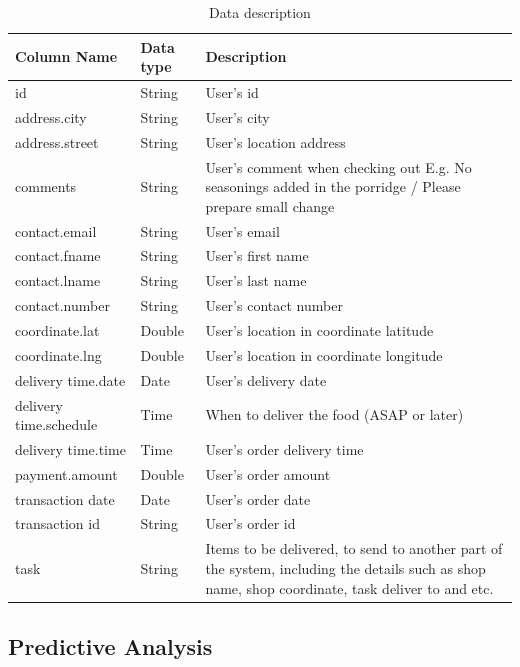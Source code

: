 \documentclass[journal]{IEEEtran}
\begin{document}
\begin{table}[!ht]
	\renewcommand{\arraystretch}{1.3}
	\setlength\extrarowheight{2.5pt}
	\caption{Data description}
	\centering
\begin{tabular}{|l|l|>{\raggedright\arraybackslash}p{3cm}|}
	\hline 
	Column Name & Data type & Description \\ 
	\hline 
	id & String & User’s id \\ 
	\hline 
	address.city & String & User’s city \\ 
	\hline 
	address.street & String & User’s location address \\ 
	\hline 
	comments & String & User’s comment when checking out
	E.g. No seasonings added in the porridge / Please prepare small change
	\\ 
	\hline 
	contact.email & String & User’s email \\ 
	\hline 
	contact.fname & String & User’s first name \\ 
	\hline 
	contact.lname & String & User’s last name \\ 
	\hline 
	contact.number & String & User’s contact number \\ 
	\hline 
	coordinate.lat & Double & User’s location in coordinate latitude \\ 
	\hline 
	coordinate.lng & Double & User’s location in coordinate longitude \\ 
	\hline 
	delivery time.date & Date & User’s delivery date \\ 
	\hline 
	delivery time.schedule & Time & When to deliver the food (ASAP or later) \\ 
	\hline 
	delivery time.time & Time & User’s order delivery time \\ 
	\hline 
	payment.amount & Double & User’s order amount \\ 
	\hline 
	transaction date & Date & User’s order date \\ 
	\hline 
	transaction id & String & User’s order id \\ 
	\hline 
	task & String & Items to be delivered, to send to another part of the system, including the details such as shop name, shop coordinate, task deliver to and etc. \\ 
	\hline 
\end{tabular} 
\end{table}

\subsection{Predictive Analysis}
\end{document}
